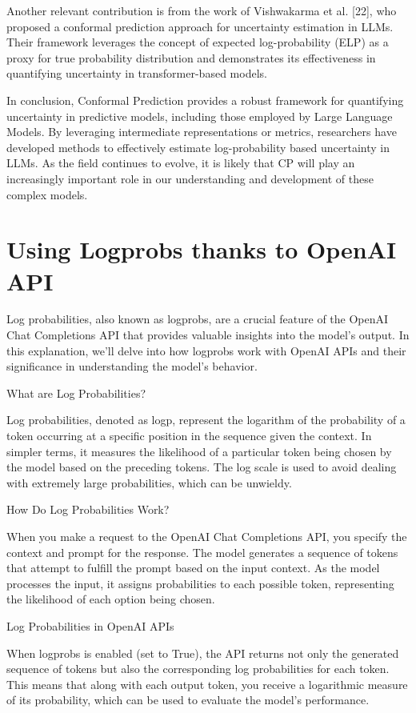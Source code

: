 Another relevant contribution is from the work of Vishwakarma et al. [22], who proposed
a conformal prediction approach for uncertainty estimation in LLMs. Their
framework leverages the concept of expected log-probability (ELP) as a proxy for
true probability distribution and demonstrates its effectiveness in quantifying
uncertainty in transformer-based models.

In conclusion, Conformal Prediction provides a robust framework for quantifying uncertainty
in predictive models, including those employed by Large Language Models. By leveraging
intermediate representations or metrics, researchers have developed methods to
effectively estimate log-probability based uncertainty in LLMs. As the field continues
to evolve, it is likely that CP will play an increasingly important role in our
understanding and development of these complex models.
\section{Using Logprobs thanks to OpenAI API}
Log probabilities, also known as logprobs, are a crucial feature of the OpenAI Chat
Completions API that provides valuable insights into the model's output. In this
explanation, we'll delve into how logprobs work with OpenAI APIs and their significance
in understanding the model's behavior.

What are Log Probabilities?

Log probabilities, denoted as logp, represent the logarithm of the probability of
a token occurring at a specific position in the sequence given the context. In
simpler terms, it measures the likelihood of a particular token being chosen by the
model based on the preceding tokens. The log scale is used to avoid dealing with
extremely large probabilities, which can be unwieldy.

How Do Log Probabilities Work?

When you make a request to the OpenAI Chat Completions API, you specify the
context and prompt for the response. The model generates a sequence of tokens that
attempt to fulfill the prompt based on the input context. As the model processes
the input, it assigns probabilities to each possible token, representing the
likelihood of each option being chosen.

Log Probabilities in OpenAI APIs

When logprobs is enabled (set to True), the API returns not only the generated
sequence of tokens but also the corresponding log probabilities for each token. This
means that along with each output token, you receive a logarithmic measure of
its probability, which can be used to evaluate the model's performance.


